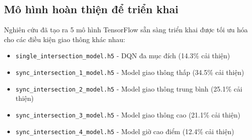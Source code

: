 \subsection{Mô hình hoàn thiện để triển khai}

Nghiên cứu đã tạo ra 5 mô hình TensorFlow sẵn sàng triển khai được tối ưu hóa 
cho các điều kiện giao thông khác nhau:

\begin{itemize}
    \item \texttt{single\_intersection\_model.h5} - DQN đa mục đích (14.3\% cải thiện)
    \item \texttt{sync\_intersection\_1\_model.h5} - Model giao thông thấp (34.5\% cải thiện)
    \item \texttt{sync\_intersection\_2\_model.h5} - Model giao thông trung bình (25.1\% cải thiện)  
    \item \texttt{sync\_intersection\_3\_model.h5} - Model giao thông cao (21.1\% cải thiện)
    \item \texttt{sync\_intersection\_4\_model.h5} - Model giờ cao điểm (12.4\% cải thiện)
\end{itemize}
